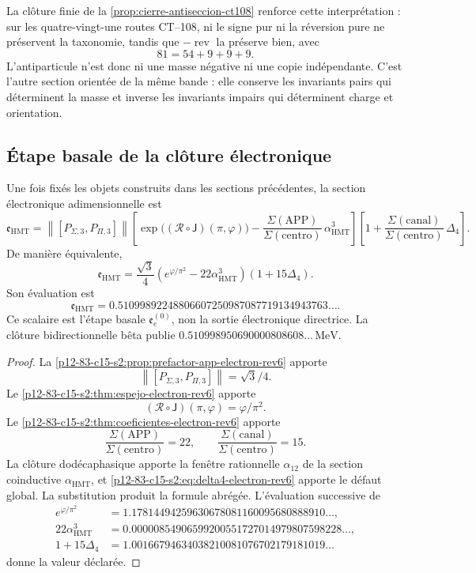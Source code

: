 La clôture finie de la \cref{prop:cierre-antiseccion-ct108} renforce cette
interprétation : sur les quatre-vingt-une routes CT--108, ni le signe pur ni
la réversion pure ne préservent la taxonomie, tandis que
\(-\operatorname{rev}\) la préserve bien, avec
\[
 81=54+9+9+9.
\]
L'antiparticule n'est donc ni une masse négative ni une copie
indépendante. C'est l'autre section orientée de la même bande : elle conserve les
invariants pairs qui déterminent la masse et inverse les invariants impairs qui
déterminent charge et orientation.

\subsection{Étape basale de la clôture électronique}

\begin{theorem}
\label{p12-83-c15-s2:thm:cierre-electron-holografico-rev6}
Une fois fixés les objets construits dans les sections précédentes, la section
électronique adimensionnelle est
\[
 \mathfrak e_{\mathrm{HMT}}
 =
 \left\|[P_{\Sigma,3},P_{\Pi,3}]\right\|
 \left[
 \exp\bigl((\mathscr R\circ\mathsf J)(\pi,\varphi)\bigr)
 -\frac{\Sigma(\mathrm{APP})}
 {\Sigma(\mathrm{centro})}\,
 \alpha_{\mathrm{HMT}}^3
 \right]
 \left[
 1+
 \frac{\Sigma(\mathrm{canal})}
 {\Sigma(\mathrm{centro})}\,
 \Delta_4
 \right].
\]
De manière équivalente,
\[
 \boxed{
 \mathfrak e_{\mathrm{HMT}}
 =
 \frac{\sqrt3}{4}
 \left(e^{\varphi/\pi^2}
 -22\alpha_{\mathrm{HMT}}^3\right)
 (1+15\Delta_4).}
\]
Son évaluation est
\[
 \boxed{
 \mathfrak e_{\mathrm{HMT}}
 =
 0.51099892248806607250987087719134943763\ldots.}
\]
Ce scalaire est l'étape basale \(\mathfrak e_e^{(0)}\), non la sortie
électronique directrice. La clôture bidirectionnelle bêta publie
\(0.510998950690000808608\ldots\,\mathrm{MeV}\).
\end{theorem}

\begin{proof}
La \cref{p12-83-c15-s2:prop:prefactor-app-electron-rev6} apporte
\[
 \left\|[P_{\Sigma,3},P_{\Pi,3}]\right\|=\sqrt3/4.
\]
Le \cref{p12-83-c15-s2:thm:espejo-electron-rev6} apporte
\[
 (\mathscr R\circ\mathsf J)(\pi,\varphi)=\varphi/\pi^2.
\]
Le \cref{p12-83-c15-s2:thm:coeficientes-electron-rev6} apporte
\[
 \frac{\Sigma(\mathrm{APP})}{\Sigma(\mathrm{centro})}=22,
 \qquad
 \frac{\Sigma(\mathrm{canal})}{\Sigma(\mathrm{centro})}=15.
\]
La clôture dodécaphasique apporte la fenêtre rationnelle \(\alpha_{12}\) de la
section coinductive \(\alpha_{\mathrm{HMT}}\), et
\cref{p12-83-c15-s2:eq:delta4-electron-rev6} apporte le défaut global. La substitution
produit la formule abrégée. L'évaluation successive de
\[
\begin{aligned}
 e^{\varphi/\pi^2}
 &=1.17814494259630678081160095680888910\ldots,\\
 22\alpha_{\mathrm{HMT}}^3
 &=0.00000854906599200551727014979807598228\ldots,\\
 1+15\Delta_4
 &=1.00166794634038210081076702179181019\ldots
\end{aligned}
\]
donne la valeur déclarée.
\end{proof}

